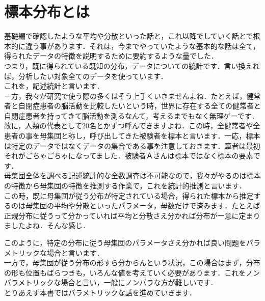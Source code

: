 \documentclass[11pt,a4paper,uplatex]{ujreport} 	%
\begin{document}
\section{標本分布とは}

基礎編で確認したような平均や分散といった話と，これ以降でしていく話とで根本的に違う事があります．それは，今までやっていたような基本的な話は全て，得られたデータの特徴を説明するために要約するような量でした．\\

つまり，既に得られている既知の分布，データについての統計です．言い換えれば，分析したい対象全てのデータを使っています．\\

これを，記述統計と言います．\\

一方，我々が研究で使う際の多くはそう上手くいきませんよね．たとえば，健常者と自閉症患者の脳活動を比較したいという時，世界に存在する全ての健常者と自閉症患者を持ってきて脳活動を測るなんて，考えるまでもなく無理ゲーです．\\

故に，人類の代表として20名とかずつ呼んできますよね．この時，全健常者や全患者の事を母集団と称し，呼び出してきた被験者を標本と言います．一応，標本は特定のデータではなくデータの集合である事を注意しておきます．筆者は最初それがごちゃごちゃになってました．被験者Ａさんは標本ではなく標本の要素です．\\

母集団全体を調べる記述統計的な全数調査は不可能なので，我々がやるのは標本の特徴から母集団の特徴を推測する作業で，これを統計的推測と言います．\\

この時，既に母集団が従う分布が特定されている場合，得られた標本から推定するのは母集団の平均や分散といったパラメータ，母数だけで済みます．たとえば正規分布に従うって分かっていれば平均と分散さえ分かれば分布が一意に定まりましたよね．そんな感じ．

このように，特定の分布に従う母集団のパラメータさえ分かれば良い問題をパラメトリックな場合と言います．\\

一方で，母集団が従う分布の形すら分からんという状況，この場合はまず，分布の形も位置もばらつきも，いろんな値を考えていく必要があります．これをノンパラメトリックな場合と言い，一般にノンパラな方が難しいです．\\

とりあえず本書ではパラメトリックな話を進めていきます．\\
\end{document}
